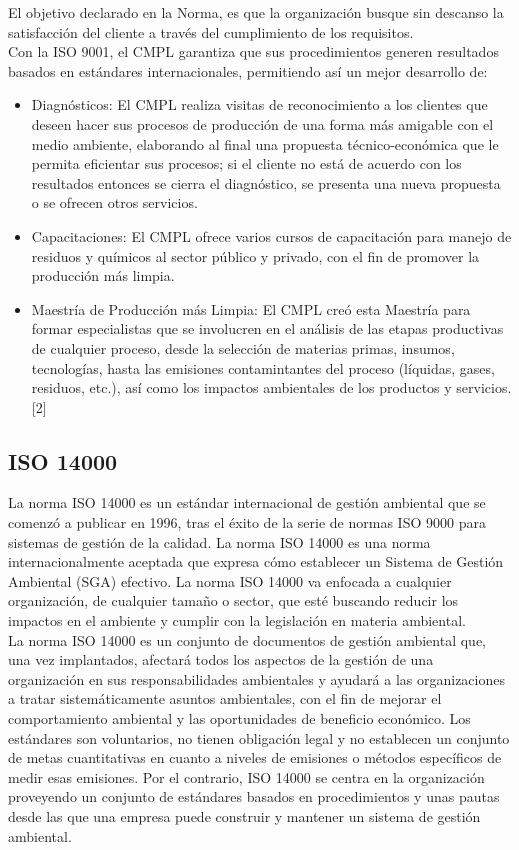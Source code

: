 	El objetivo declarado en la Norma, es que la organización busque sin descanso la satisfacción del cliente a través del cumplimiento de los requisitos.\\
	
	Con la ISO 9001, el CMPL garantiza que sus procedimientos generen resultados basados en estándares internacionales, permitiendo así un mejor desarrollo de:\\

	\begin{itemize}
		\item Diagnósticos: El CMPL realiza visitas de reconocimiento a los clientes que deseen hacer sus procesos de producción de una forma más amigable con el medio ambiente, elaborando al final una propuesta técnico-económica que le permita eficientar sus procesos; si el cliente no está de acuerdo con los resultados entonces se cierra el diagnóstico, se presenta una nueva propuesta o se ofrecen otros servicios.
		\item Capacitaciones: El CMPL ofrece varios cursos de capacitación para manejo de residuos y químicos al sector público y privado, con el fin de promover la producción más limpia.
		\item Maestría de Producción más Limpia: El CMPL creó esta Maestría para formar especialistas que se involucren en el análisis de las etapas productivas de cualquier proceso, desde la selección de materias primas, insumos, tecnologías, hasta las emisiones contamintantes del proceso (líquidas, gases, residuos, etc.), así como los impactos ambientales de los productos y servicios.[2]
	\end{itemize}
	
	\subsection{ISO 14000}
	La norma ISO 14000 es un estándar internacional de gestión ambiental que se comenzó a publicar en 1996, tras el éxito de la serie de normas ISO 9000 para sistemas de gestión de la calidad. La norma ISO 14000 es una norma internacionalmente aceptada que expresa cómo establecer un Sistema de Gestión Ambiental (SGA) efectivo. La norma ISO 14000 va enfocada a cualquier organización, de cualquier tamaño o sector, que esté buscando reducir los impactos en el ambiente y cumplir con la legislación en materia ambiental.\\
	
	La norma ISO 14000 es un conjunto de documentos de gestión ambiental que, una vez implantados, afectará todos los aspectos de la gestión de una organización en sus responsabilidades ambientales y ayudará a las organizaciones a tratar sistemáticamente asuntos ambientales, con el fin de mejorar el comportamiento ambiental y las oportunidades de beneficio económico. Los estándares son voluntarios, no tienen obligación legal y no establecen un conjunto de metas cuantitativas en cuanto a niveles de emisiones o métodos específicos de medir esas emisiones. Por el contrario, ISO 14000 se centra en la organización proveyendo un conjunto de estándares basados en procedimientos y unas pautas desde las que una empresa puede construir y mantener un sistema de gestión ambiental.\\
	
